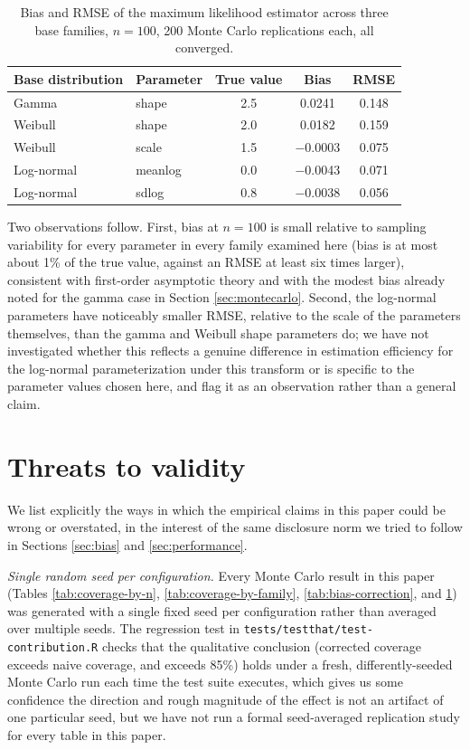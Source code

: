 \begin{table}[htbp]
\centering
\begin{tabular}{@{}llccc@{}}
\toprule
Base distribution & Parameter & True value & Bias & RMSE \\
\midrule
Gamma & shape & 2.5 & 0.0241 & 0.148 \\
Weibull & shape & 2.0 & 0.0182 & 0.159 \\
Weibull & scale & 1.5 & $-$0.0003 & 0.075 \\
Log-normal & meanlog & 0.0 & $-$0.0043 & 0.071 \\
Log-normal & sdlog & 0.8 & $-$0.0038 & 0.056 \\
\bottomrule
\end{tabular}
\caption{Bias and RMSE of the maximum likelihood estimator across three
base families, $n=100$, 200 Monte Carlo replications each, all
converged.}
\label{tab:mc-three-families}
\end{table}

Two observations follow. First, bias at $n=100$ is small relative to
sampling variability for every parameter in every family examined here
(bias is at most about 1\% of the true value, against an RMSE at least
six times larger), consistent with first-order asymptotic theory and
with the modest bias already noted for the gamma case in Section
\ref{sec:montecarlo}. Second, the log-normal parameters have
noticeably smaller RMSE, relative to the scale of the parameters
themselves, than the gamma and Weibull shape parameters do; we have not
investigated whether this reflects a genuine difference in estimation
efficiency for the log-normal parameterization under this transform or
is specific to the parameter values chosen here, and flag it as an
observation rather than a general claim.

\section{Threats to validity}
\label{sec:threats}

We list explicitly the ways in which the empirical claims in this paper
could be wrong or overstated, in the interest of the same disclosure
norm we tried to follow in Sections \ref{sec:bias} and
\ref{sec:performance}.

\emph{Single random seed per configuration.} Every Monte Carlo result
in this paper (Tables \ref{tab:coverage-by-n},
\ref{tab:coverage-by-family}, \ref{tab:bias-correction}, and
\ref{tab:mc-three-families}) was generated with a single fixed seed
per configuration rather than averaged over multiple seeds. The
regression test in \texttt{tests/testthat/test-contribution.R} checks
that the qualitative conclusion (corrected coverage exceeds naive
coverage, and exceeds 85\%) holds under a fresh, differently-seeded
Monte Carlo run each time the test suite executes, which gives us some
confidence the direction and rough magnitude of the effect is not an
artifact of one particular seed, but we have not run a formal
seed-averaged replication study for every table in this paper.

